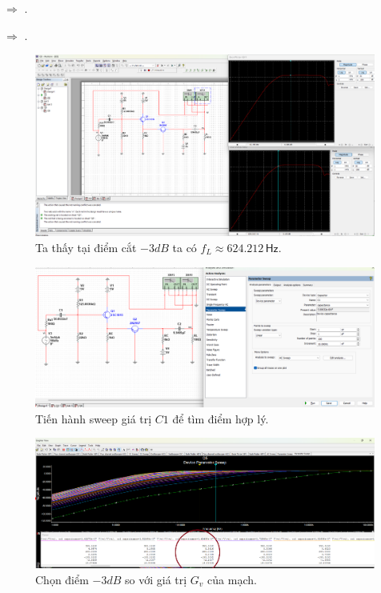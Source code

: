 $\Rightarrow$ .

$\Rightarrow$ .

\begin{figure}[H]
	\centering
	\includegraphics[width=\linewidth]{./my-chapters/my-images/Question5/c_do_bode_socap.png}
	\caption{Ta thấy tại điểm cắt $-3dB$ ta có $f_{L} \approx 624.212\,\textsf{Hz}$.}
\end{figure}

\begin{figure}[H]
	\centering
	\includegraphics[width=\linewidth]{./my-chapters/my-images/Question5/c_sweep.png}
	\caption{Tiến hành sweep giá trị $C1$ để tìm điểm hợp lý.}
\end{figure}

\begin{figure}[H]
	\centering
	\includegraphics[width=\linewidth]{./my-chapters/my-images/Question5/c_sweep_c.png}
	\caption{Chọn điểm $-3dB$ so với giá trị $G_{v}$ của mạch.}
\end{figure}

